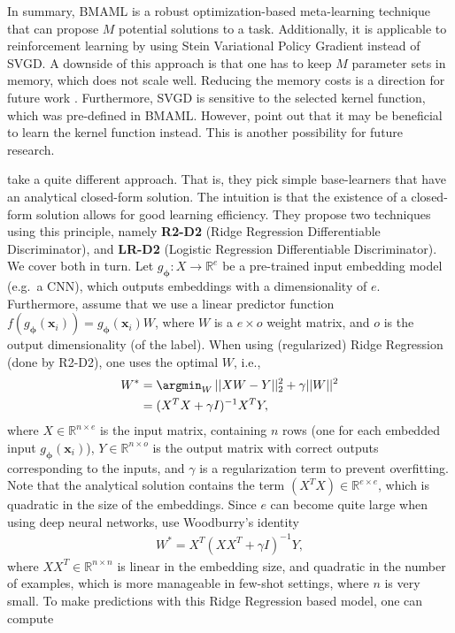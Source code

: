 In summary, BMAML is a robust optimization-based meta-learning technique that can propose $M$ potential solutions to a task. Additionally, it is applicable to reinforcement learning by using Stein Variational Policy Gradient instead of SVGD. A downside of this approach is that one has to keep $M$ parameter sets in memory, which does not scale well. Reducing the memory costs is a direction for future work . Furthermore, SVGD is sensitive to the selected kernel function, which was pre-defined in BMAML. However,  point out that it may be beneficial to learn the kernel function instead. This is another possibility for future research.

 take a quite different approach. That is, they pick simple base-learners that have an analytical closed-form solution. The intuition is that the existence of a closed-form solution allows for good learning efficiency. They propose two techniques using this principle, namely \textbf{R2-D2} (Ridge Regression Differentiable Discriminator), and \textbf{LR-D2} (Logistic Regression Differentiable Discriminator). We cover both in turn. 
Let $g_{\boldsymbol{\phi}}: X \rightarrow \mathbb{R}^{e}$ be a pre-trained input embedding model (e.g.\ a CNN), which outputs embeddings with a dimensionality of $e$. Furthermore, assume that we use a linear predictor function $f(g_{\boldsymbol{\phi}}(\boldsymbol{x}_{i})) = g_{\boldsymbol{\phi}}(\boldsymbol{x}_{i})W$, where $W$ is a $e \times o$ weight matrix, and $o$ is the output dimensionality (of the label). When using (regularized) Ridge Regression (done by R2-D2), one uses the optimal $W$, i.e.,
\begin{align}
    W^{*} &= \argmin_{W} \, || XW - Y||^{2}_{2} + \gamma ||W||^{2} \nonumber \\
    &= (X^{T}X + \gamma I)^{-1}X^{T}Y, \label{eq:ridgeregression}
\end{align} where $X \in \mathbb{R}^{n \times e}$ is the input matrix, containing $n$ rows (one for each embedded input $g_{\boldsymbol{\phi}}(\boldsymbol{x}_{i})$), $Y \in \mathbb{R}^{n \times o}$ is the output matrix with correct outputs corresponding to the inputs, and $\gamma$ is a regularization term to prevent overfitting. Note that the analytical solution contains the term $(X^{T}X) \in \mathbb{R}^{e \times e}$, which is quadratic in the size of the embeddings. Since $e$ can become quite large when using deep neural networks,  use Woodburry's identity
\begin{align}
    W^{*} = X^{T}(XX^{T} + \gamma I)^{-1} Y,
\end{align} where $XX^{T} \in \mathbb{R}^{n \times n}$ is linear in the embedding size, and quadratic in the number of examples, which is more manageable in few-shot settings, where $n$ is very small. To make predictions with this Ridge Regression based model, one can compute 
